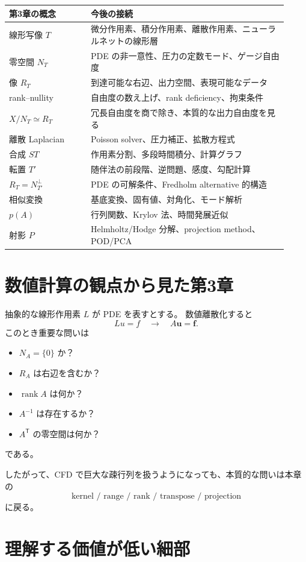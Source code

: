 \documentclass[a4paper,11pt]{ltjsarticle}
\newcommand{\rank}{\operatorname{rank}}
\begin{document}
\begin{longtable}{p{0.27\linewidth}p{0.65\linewidth}}
\toprule
\textbf{第3章の概念} & \textbf{今後の接続}\\
\midrule
\endhead
線形写像 $T$ & 微分作用素、積分作用素、離散作用素、ニューラルネットの線形層\\
零空間 $N_T$ & PDE の非一意性、圧力の定数モード、ゲージ自由度\\
像 $R_T$ & 到達可能な右辺、出力空間、表現可能なデータ\\
rank--nullity & 自由度の数え上げ、rank deficiency、拘束条件\\
$X/N_T\simeq R_T$ & 冗長自由度を商で除き、本質的な出力自由度を見る\\
離散 Laplacian & Poisson solver、圧力補正、拡散方程式\\
合成 $ST$ & 作用素分割、多段時間積分、計算グラフ\\
転置 $T'$ & 随伴法の前段階、逆問題、感度、勾配計算\\
$R_T=N_{T'}^\perp$ & PDE の可解条件、Fredholm alternative 的構造\\
相似変換 & 基底変換、固有値、対角化、モード解析\\
$p(A)$ & 行列関数、Krylov 法、時間発展近似\\
射影 $P$ & Helmholtz/Hodge 分解、projection method、POD/PCA\\
\bottomrule
\end{longtable}

\section{数値計算の観点から見た第3章}

抽象的な線形作用素 $L$ が PDE を表すとする。
数値離散化すると
\[
Lu=f
\quad\longrightarrow\quad
A\bm u=\bm f.
\]
このとき重要な問いは
\begin{itemize}
  \item $N_A=\{0\}$ か？
  \item $R_A$ は右辺を含むか？
  \item $\rank A$ は何か？
  \item $A^{-1}$ は存在するか？
  \item $A^{\mathsf T}$ の零空間は何か？
\end{itemize}
である。

したがって、CFD で巨大な疎行列を扱うようになっても、本質的な問いは本章の
\[
\boxed{\text{kernel / range / rank / transpose / projection}}
\]
に戻る。

\section{理解する価値が低い細部}
\end{document}
